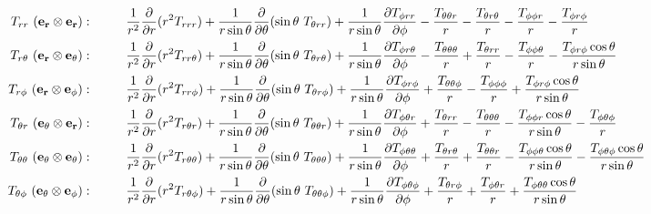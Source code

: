 \documentclass[10pt,paper=a4]{report}
\newcommand{\dr}{\frac{\partial}{\partial r}}
\begin{document}
\begin{align}
T_{rr} \ ({\bf{e_r \otimes e_r}}): & \hspace{1cm} \frac{1}{r^2}\dr (r^2 T_{rrr}) + \frac{1}{r\sin{\theta}}\frac{\partial}{\partial \theta} (\sin{\theta} \ T_{\theta rr}) + \frac{1}{r\sin{\theta}}\frac{\partial T_{\phi rr}}{\partial \phi} - \frac{T_{\theta\theta r}}{r} - \frac{T_{\theta r \theta}}{r} -\frac{T_{\phi\phi r}}{r} - \frac{T_{\phi r \phi}}{r} \\
T_{r\theta} \ ({\bf{e_r \otimes e_\theta}}): & \hspace{1cm} \frac{1}{r^2}\dr (r^2 T_{rr \theta}) + \frac{1}{r\sin{\theta}}\frac{\partial}{\partial \theta} (\sin{\theta} \ T_{\theta r \theta}) + \frac{1}{r\sin{\theta}}\frac{\partial T_{\phi r \theta}}{\partial \phi} - \frac{T_{\theta \theta \theta}}{r} + \frac{T_{\theta rr}}{r} - \frac{T_{\phi \phi \theta}}{r} - \frac{T_{\phi r \phi} \cos{\theta}}{r\sin{\theta}} \\
T_{r \phi} \ ({\bf{e_r \otimes e_\phi}}): & \hspace{1cm} \frac{1}{r^2}\dr (r^2 T_{rr \phi}) + \frac{1}{r\sin{\theta}}\frac{\partial}{\partial \theta} (\sin{\theta} \ T_{\theta r \phi}) + \frac{1}{r\sin{\theta}}\frac{\partial T_{\phi r \phi}}{\partial \phi} + \frac{T_{\theta \theta \phi}}{r} - \frac{T_{\phi \phi \phi}}{r} + \frac{T_{\phi r \phi} \cos{\theta}}{r\sin{\theta}} \\
T_{\theta r} \ ({\bf{e_\theta \otimes e_r}}): & \hspace{1cm} \frac{1}{r^2}\dr (r^2 T_{r \theta r}) + \frac{1}{r\sin{\theta}}\frac{\partial}{\partial \theta} (\sin{\theta} \ T_{\theta \theta r}) + \frac{1}{r\sin{\theta}}\frac{\partial T_{\phi \theta r}}{\partial \phi} + \frac{T_{\theta rr}}{r} - \frac{T_{\theta \theta \theta}}{r} -\frac{T_{\phi \phi r} \cos{\theta}}{r \sin{\theta}} - \frac{T_{\phi \theta \phi}}{r}  \\
T_{\theta \theta} \ ({\bf{e_\theta \otimes e_\theta}}): & \hspace{1cm} \frac{1}{r^2}\dr (r^2 T_{r \theta \theta}) + \frac{1}{r\sin{\theta}}\frac{\partial}{\partial \theta} (\sin{\theta} \ T_{\theta \theta \theta}) + \frac{1}{r\sin{\theta}}\frac{\partial T_{\phi \theta \theta}}{\partial \phi} + \frac{T_{\theta r \theta}}{r} + \frac{T_{\theta \theta r}}{r} - \frac{T_{\phi \phi \theta} \cos{\theta}}{r\sin{\theta}} - \frac{T_{\phi \theta \phi} \cos{\theta}}{r\sin{\theta}} \\
T_{\theta \phi} \ ({\bf{e_\theta \otimes e_\phi}}): & \hspace{1cm} \frac{1}{r^2}\dr (r^2 T_{r \theta \phi}) + \frac{1}{r\sin{\theta}}\frac{\partial}{\partial \theta} (\sin{\theta} \ T_{\theta \theta \phi}) + \frac{1}{r\sin{\theta}}\frac{\partial T_{\phi \theta \phi}}{\partial \phi} + \frac{T_{\theta r \phi}}{r} + \frac{T_{\phi \theta r}}{r} + \frac{T_{\phi \theta \theta} \cos{\theta}}{r\sin{\theta}} \\

\end{align}
\end{document}
